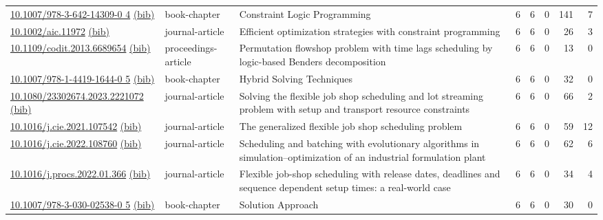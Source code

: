 {\begin{longtable}{p{5cm}lp{11cm}rrrrr}
\href{http://dx.doi.org/10.1007/978-3-642-14309-0_4}{10.1007/978-3-642-14309-0 4} \href{https://www.doi2bib.org/bib/10.1007/978-3-642-14309-0_4}{(bib)} & book-chapter & Constraint Logic Programming & 6 & 6 & 0 & 141 & 7 \\
\href{http://dx.doi.org/10.1002/aic.11972}{10.1002/aic.11972} \href{https://www.doi2bib.org/bib/10.1002/aic.11972}{(bib)} & journal-article & Efficient optimization strategies with constraint programming & 6 & 6 & 0 & 26 & 3 \\
\href{http://dx.doi.org/10.1109/codit.2013.6689654}{10.1109/codit.2013.6689654} \href{https://www.doi2bib.org/bib/10.1109/codit.2013.6689654}{(bib)} & proceedings-article & Permutation flowshop problem with time lags scheduling by logic-based Benders decomposition & 6 & 6 & 0 & 13 & 0 \\
\href{http://dx.doi.org/10.1007/978-1-4419-1644-0_5}{10.1007/978-1-4419-1644-0 5} \href{https://www.doi2bib.org/bib/10.1007/978-1-4419-1644-0_5}{(bib)} & book-chapter & Hybrid Solving Techniques & 6 & 6 & 0 & 32 & 0 \\
\href{http://dx.doi.org/10.1080/23302674.2023.2221072}{10.1080/23302674.2023.2221072} \href{https://www.doi2bib.org/bib/10.1080/23302674.2023.2221072}{(bib)} & journal-article & Solving the flexible job shop scheduling and lot streaming problem with setup and transport resource constraints & 6 & 6 & 0 & 66 & 2 \\
\href{http://dx.doi.org/10.1016/j.cie.2021.107542}{10.1016/j.cie.2021.107542} \href{https://www.doi2bib.org/bib/10.1016/j.cie.2021.107542}{(bib)} & journal-article & The generalized flexible job shop scheduling problem & 6 & 6 & 0 & 59 & 12 \\
\href{http://dx.doi.org/10.1016/j.cie.2022.108760}{10.1016/j.cie.2022.108760} \href{https://www.doi2bib.org/bib/10.1016/j.cie.2022.108760}{(bib)} & journal-article & Scheduling and batching with evolutionary algorithms in simulation–optimization of an industrial formulation plant & 6 & 6 & 0 & 62 & 6 \\
\href{http://dx.doi.org/10.1016/j.procs.2022.01.366}{10.1016/j.procs.2022.01.366} \href{https://www.doi2bib.org/bib/10.1016/j.procs.2022.01.366}{(bib)} & journal-article & Flexible job-shop scheduling with release dates, deadlines and sequence dependent setup times: a real-world case & 6 & 6 & 0 & 34 & 4 \\
\href{http://dx.doi.org/10.1007/978-3-030-02538-0_5}{10.1007/978-3-030-02538-0 5} \href{https://www.doi2bib.org/bib/10.1007/978-3-030-02538-0_5}{(bib)} & book-chapter & Solution Approach & 6 & 6 & 0 & 30 & 0 \\

\end{longtable}}
